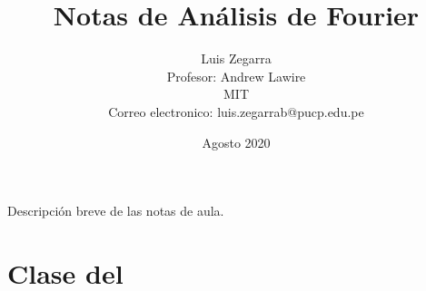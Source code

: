 \documentclass[11pt]{article}
\title{Notas de Análisis de Fourier}
\author{Luis Zegarra \\ Profesor: Andrew Lawire \\ MIT \\ Correo electronico: luis.zegarrab@pucp.edu.pe}
\date{Agosto 2020}
\begin{document}
 

\maketitle

Descripción breve de las notas de aula.

\tableofcontents

\newpage

\section{Clase del }


\end{document}
